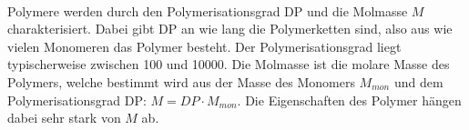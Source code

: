 \documentclass[11pt,a4paper]{article}
\numberwithin{equation}{section}
\numberwithin{figure}{section}
\begin{document}
\\
\begin{addmargin}[25pt]{0pt}
Polymere werden durch den Polymerisationsgrad DP und die Molmasse $M$ charakterisiert. Dabei gibt DP an wie lang die Polymerketten sind, also aus wie vielen Monomeren das Polymer besteht. Der Polymerisationsgrad liegt typischerweise zwischen 100 und 10000. Die Molmasse ist die molare Masse des Polymers, welche bestimmt wird aus der Masse des Monomers $M_{\si{mon}}$ und dem Polymerisationsgrad DP: $M = \si{DP} \cdot M_{\si{mon}}$. Die Eigenschaften des Polymer hängen dabei sehr stark von $M$ ab.  \\
\end{addmargin}
\end{document}

